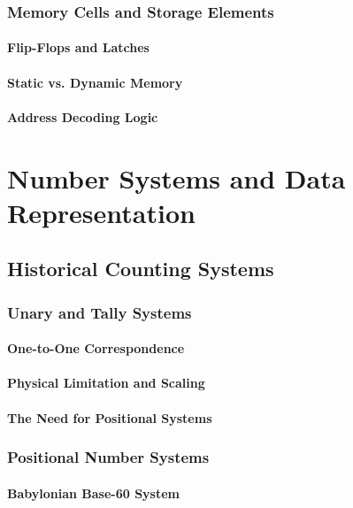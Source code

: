 \documentclass[12pt, oneside, openany]{book}
\begin{document}
\subsection{Memory Cells and Storage Elements}
\subsubsection{Flip-Flops and Latches}
\subsubsection{Static vs. Dynamic Memory}
\subsubsection{Address Decoding Logic}


\chapter{Number Systems and Data Representation}

\section{Historical Counting Systems}
\subsection{Unary and Tally Systems}
\subsubsection{One-to-One Correspondence}
\subsubsection{Physical Limitation and Scaling}
\subsubsection{The Need for Positional Systems}

\subsection{Positional Number Systems}
\subsubsection{Babylonian Base-60 System}
\end{document}
